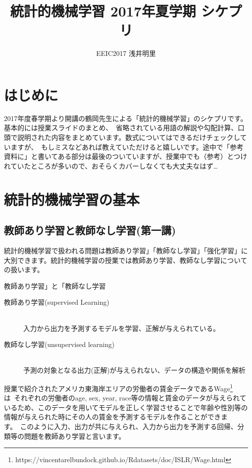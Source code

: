 \documentclass[uplatex]{jsarticle}
\title{統計的機械学習 2017年夏学期 シケプリ}
\author{EEIC2017 浅井明里}
\begin{document}
\maketitle

\section{はじめに}
2017年度春学期より開講の鶴岡先生による「統計的機械学習」のシケプリです。基本的には授業スライドのまとめ、\
省略されている用語の解説や勾配計算、口頭で説明された内容をまとめています。数式についてはできるだけチェックしていますが、\
もしミスなどあれば教えていただけると嬉しいです。途中で「参考資料に」と書いてある部分は最後のついていますが、授業中でも（参考）とつけれていたところが多いので、おそらくカバーしなくても大丈夫なはず…\

\section{統計的機械学習の基本}
\subsection{教師あり学習と教師なし学習(第一講)}
統計的機械学習で扱われる問題は教師あり学習」「教師なし学習」「強化学習」に大別できます。統計的機械学習の授業では教師あり学習、教師なし学習についての扱います。

\begin{itembox}[l]{教師あり学習」と「教師なし学習}
  \begin{description}
    \item [教師あり学習(supervised Learning)]\mbox{}\\
    入力から出力を予測するモデルを学習、正解が与えられている。
    \item [教師なし学習(unsupervised learning)]\mbox{}\\
    予測の対象となる出力(正解)が与えられない、データの構造や関係を解析
  \end{description}
\end{itembox}

授業で紹介されたアメリカ東海岸エリアの労働者の賃金データであるWage\footnote{https://vincentarelbundock.github.io/Rdatasets/doc/ISLR/Wage.html}は\
それぞれの労働者のage, sex, year, race等の情報と賃金のデータが与えられているため、このデータを用いてモデルを正しく学習させることで年齢や性別等の情報が与えられた時にその人の賃金を予測するモデルを作ることができます。\
このように入力、出力が共に与えられ、入力から出力を予測する回帰、分類等の問題を教師あり学習と言います。
\end{document}
